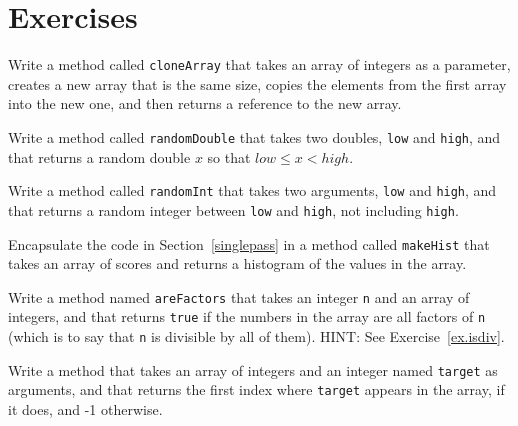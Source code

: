 \section{Exercises}

\begin{exercise}
Write a method called {\tt cloneArray} that takes an
array of integers as a parameter, creates a new array that is the same
size, copies the elements from the first array into the new one, and
then returns a reference to the new array.
\end{exercise}


\begin{exercise}
Write a method called {\tt randomDouble} that takes two doubles,
{\tt low} and {\tt high}, and that returns a random double $x$
so that $low \le x < high$.
\end{exercise}


\begin{exercise}
\label{ex.randint}
Write a method called {\tt randomInt} that takes two arguments,
{\tt low} and {\tt high}, and that returns a random integer between
{\tt low} and {\tt high}, not including {\tt high}.
\end{exercise}


\begin{exercise}
Encapsulate the code in Section~\ref{singlepass} in a method called
{\tt makeHist} that takes an array of scores and returns a histogram
of the values in the array.
\end{exercise}


\begin{exercise}
Write a method named {\tt areFactors} that takes
an integer {\tt n} and an array of integers, and that returns
{\tt true} if the numbers in the array are all factors of {\tt n}
(which is to say that {\tt n} is divisible by all of them).
HINT: See Exercise~\ref{ex.isdiv}.
\end{exercise}


\begin{exercise}
Write a method that takes an array of integers and an integer named
{\tt target} as arguments, and that returns the first index where
{\tt target} appears in the array, if it does, and -1 otherwise.
\end{exercise}


